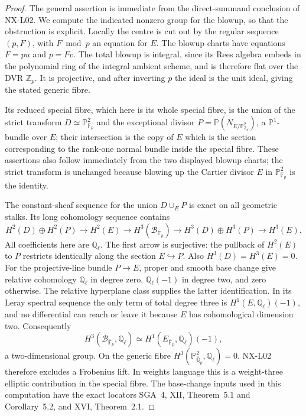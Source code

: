 \documentclass[11pt]{article}
\theoremstyle{remark}
\begin{document}
\begin{proof}
The general assertion is immediate from the direct-summand conclusion
of NX-L02.  We compute the indicated nonzero group for the blowup,
so that the obstruction is explicit.  Locally the centre is cut out
by the regular sequence $(p,F)$, with $F\bmod p$ an equation for $E$.
The blowup charts have equations $F=pu$ and $p=Fv$.  The total blowup
is integral, since its Rees algebra embeds in the polynomial ring
of the integral ambient scheme, and is therefore flat over the DVR
$\mathbb Z_p$.  It is projective, and after inverting $p$ the ideal
is the unit ideal, giving the stated generic fibre.

Its reduced special fibre, which here is its whole special fibre,
is the union of the strict transform $D\simeq\mathbb P^2_{\mathbb F_p}$
and the exceptional divisor $P=\mathbb P(N_{E/\mathbb P^2_{\mathbb Z_p}})$,
a $\mathbb P^1$-bundle over $E$; their intersection is the copy of $E$
which is the section corresponding to the rank-one normal bundle
inside the special fibre.  These assertions also follow immediately
from the two displayed blowup charts; the strict transform is unchanged
because blowing up the Cartier divisor $E$ in $\mathbb P^2_{\mathbb F_p}$
is the identity.

The constant-sheaf sequence for the union $D\cup_E P$ is exact on
all geometric stalks.  Its long cohomology sequence contains
\[
 H^2(D)\oplus H^2(P)\longrightarrow H^2(E)
 \longrightarrow H^3(\mathcal B_{\overline{\mathbb F}_p})
 \longrightarrow H^3(D)\oplus H^3(P)\longrightarrow H^3(E).
\]
All coefficients here are $\mathbb Q_\ell$.  The first arrow is
surjective: the pullback of $H^2(E)$ to $P$ restricts identically along
the section $E\hookrightarrow P$.  Also $H^3(D)=H^3(E)=0$.
For the projective-line bundle $P\to E$, proper and smooth base
change give relative cohomology $\mathbb Q_\ell$ in degree zero,
$\mathbb Q_\ell(-1)$ in degree two, and zero otherwise.  The relative
hyperplane class supplies the latter identification.  In its Leray
spectral sequence the only term of total degree three is
$H^1(E,\mathbb Q_\ell)(-1)$, and no differential can reach or leave
it because $E$ has cohomological dimension two.  Consequently
\[
 H^3(\mathcal B_{\overline{\mathbb F}_p},\mathbb Q_\ell)
 \simeq H^1(E_{\overline{\mathbb F}_p},\mathbb Q_\ell)(-1),
\]
a two-dimensional group.  On the generic fibre
$H^3(\mathbb P^2_{\overline{\mathbb Q}_p},\mathbb Q_\ell)=0$.
NX-L02 therefore excludes a Frobenius lift.  In weights language this
is a weight-three elliptic contribution in the special fibre.  The
base-change inputs used in this computation have the exact locators
SGA~4, XII, Theorem~5.1 and Corollary~5.2, and XVI, Theorem~2.1.
\end{proof}
\end{document}
